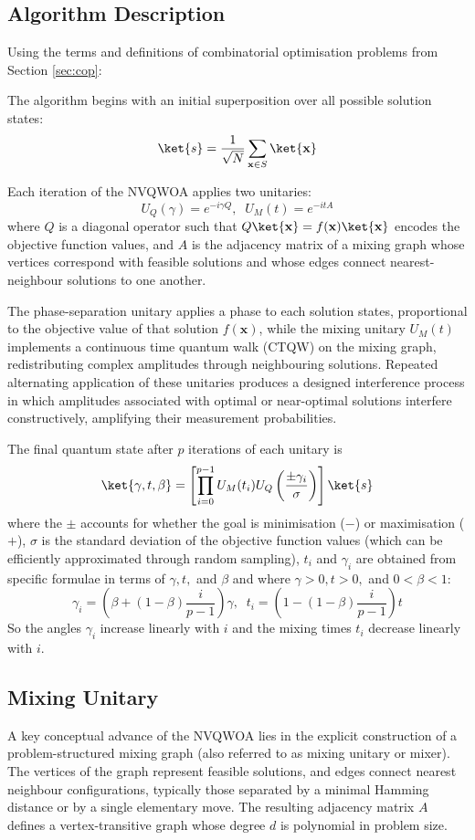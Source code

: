 \subsection{Algorithm Description}
Using the terms and definitions of combinatorial optimisation problems from Section \ref{sec:cop}:

The algorithm begins with an initial superposition over all possible solution states:
$$\ket{s}=\frac{1}{\sqrt{N}}\sum_{\mathbf{x}\in S}\ket{\mathbf{x}}$$

Each iteration of the NVQWOA applies two unitaries:
$$U_Q(\gamma)=e^{-i\gamma Q},\;\;U_M(t)=e^{-itA}$$
where $Q$ is a diagonal operator such that $Q\ket{\mathbf{x}}=f(\mathbf{x})\ket{\mathbf{x}}$ encodes the objective function values, and $A$ is the adjacency matrix of a mixing graph whose vertices correspond with feasible solutions and whose edges connect nearest-neighbour solutions to one another.

The phase-separation unitary applies a phase to each solution states, proportional to the objective value of that solution $f(\mathbf{x})$, while the mixing unitary $U_M(t)$ implements a continuous time quantum walk (CTQW) on the mixing graph, redistributing complex amplitudes through neighbouring solutions. Repeated alternating application of these unitaries produces a designed interference process in which amplitudes associated with optimal or near-optimal solutions interfere constructively, amplifying their measurement probabilities.

The final quantum state after $p$ iterations of each unitary is
$$\ket{\gamma,t,\beta}=\left[\prod_{i=0}^{p-1} U_M(t_i)U_Q\left(\frac{\pm \gamma_i}{\sigma}\right)\right] \ket{s}$$
where the $\pm$ accounts for whether the goal is minimisation ($-$) or maximisation ($+$), $\sigma$ is the standard deviation of the objective function values (which can be efficiently approximated through random sampling), $t_i$ and $\gamma_i$ are obtained from specific formulae in terms of $\gamma, t,$ and $\beta$ and where $\gamma>0, t>0,$ and $0<\beta<1$:
$$\gamma_i=\left(\beta + (1-\beta)\frac{i}{p-1} \right)\gamma,\;\;t_i=\left(1- (1-\beta)\frac{i}{p-1} \right)t$$
So the angles $\gamma_i$ increase linearly with $i$ and the mixing times $t_i$ decrease linearly with $i$.

\subsection{Mixing Unitary}
A key conceptual advance of the NVQWOA lies in the explicit construction of a problem-structured mixing graph (also referred to as mixing unitary or mixer). The vertices of the graph represent feasible solutions, and edges connect nearest neighbour configurations, typically those separated by a minimal Hamming distance or by a single elementary move. The resulting adjacency matrix $A$ defines a vertex-transitive graph whose degree $d$ is polynomial in problem size.

